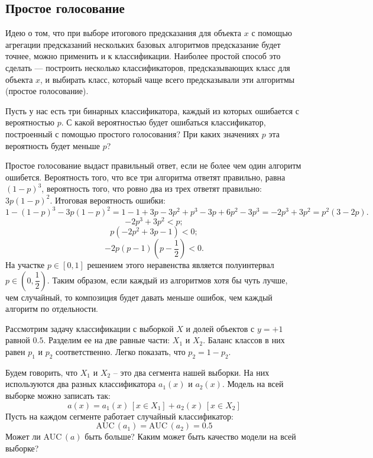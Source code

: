 \documentclass[12pt,fleqn]{article}
\begin{document}
    \subsection{Простое голосование}
    Идею о том, что при выборе итогового предсказания для объекта $x$ с помощью агрегации предсказаний нескольких базовых алгоритмов предсказание будет точнее, можно применить и к классификации.
    Наиболее простой способ это сделать --- построить несколько классификаторов, предсказывающих класс для объекта $x$, и выбирать класс, который чаще всего предсказывали эти алгоритмы (простое голосование).
    \begin{vkProblem}
        Пусть у нас есть три бинарных классификатора, каждый из которых ошибается с вероятностью $p$.
        С какой вероятностью будет ошибаться классификатор, построенный с помощью простого голосования?
        При каких значениях $p$ эта вероятность будет меньше $p$?
    \end{vkProblem}    
    \begin{esSolution}
        Простое голосование выдаст правильный ответ, если не более чем один алгоритм ошибется.
        Вероятность того, что все три алгоритма ответят правильно, равна $(1-p)^3$, вероятность того, что ровно два из трех ответят правильно: $3p(1-p)^2$.
        Итоговая вероятность ошибки:
        $$
        1 - (1-p)^3 - 3p(1-p)^2
        =
        1 - 1 + 3p - 3p^2 + p^3 - 3p + 6 p^2 - 3 p^3
        =
        - 2 p^3+ 3  p^2
        =
        p^2 (3 - 2p).
        $$
        $$
        - 2 p^3+ 3  p^2 < p;
        $$
        $$
        p(- 2 p^2+ 3 p - 1) < 0;
        $$
        $$
        -2 p (p-1) (p - \dfrac 1 2) < 0.
        $$
        На участке $p \in \left[0, 1\right]$ решением этого неравенства является полуинтервал $p \in (0, \dfrac{1}{2})$.
        Таким образом, если каждый из алгоритмов хотя бы чуть лучше, чем случайный, то композиция будет давать меньше ошибок, чем каждый алгоритм по отдельности.
    \end{esSolution}


    \begin{vkProblem}
        Рассмотрим задачу классификации с выборкой $X$ и долей объектов с $ y = + 1 $ равной $ 0.5 $.
        Разделим ее на две равные части: $ X_1 $ и $ X_2 $.
        Баланс классов в них равен $ p_1 $ и $ p_2 $ соответственно.
        Легко показать, что $ p_2 = 1 - p_2 $.
        
        Будем говорить, что $ X_1 $ и $ X_2 $ – это два сегмента нашей выборки.
        На них используются два разных классификатора $ a_1(x) $ и $ a_2(x) $.
        Модель на всей выборке можно записать так:
        $$
            a(x) = a_1(x)\,\left[x \in X_1\right] + a_2(x)\,\left[x \in X_2\right]
        $$
        Пусть на каждом сегменте работает случайный классификатор:
        $$
            \text{AUC}\,(a_1) = \text{AUC}\,(a_2) = 0.5
        $$
        Может ли $ \text{AUC}\,(a) $ быть больше?
        Каким может быть качество модели на всей выборке?
    \end{vkProblem}
    
\end{document}
